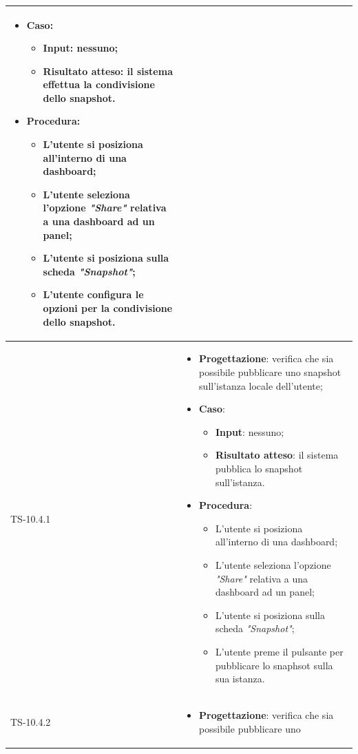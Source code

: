\begin{longtable}{|C{2.5cm}|C{13cm}|}
\begin{itemize}
	\item \textbf{Caso}: 
	\begin{itemize}
		\item \textbf{Input}: nessuno;
		\item \textbf{Risultato atteso}: il sistema effettua la condivisione dello snapshot.
	\end{itemize}
	\item \textbf{Procedura}:
	\begin{itemize}
		\item L'utente si posiziona all'interno di una dashboard;
		\item L'utente seleziona l'opzione \emph{"Share"} relativa a una dashboard ad un panel;
		\item L'utente si posiziona sulla scheda \emph{"Snapshot"};
		\item L'utente configura le opzioni per la condivisione dello snapshot.
	\end{itemize} 
\end{itemize}
	 \\
	\hline
	{TS-10.4.1} &
\begin{itemize}
	\item \textbf{Progettazione}: verifica che sia possibile pubblicare uno
	snapshot sull'istanza locale dell'utente;
	\item \textbf{Caso}: 
	\begin{itemize}
		\item \textbf{Input}: nessuno;
		\item \textbf{Risultato atteso}: il sistema pubblica lo snapshot sull'istanza.
	\end{itemize}
	\item \textbf{Procedura}:
	\begin{itemize}
		\item L'utente si posiziona all'interno di una dashboard;
		\item L'utente seleziona l'opzione \emph{"Share"} relativa a una dashboard ad un panel;
		\item L'utente si posiziona sulla scheda \emph{"Snapshot"};
		\item L'utente preme il pulsante per pubblicare lo snaphsot sulla sua istanza.
	\end{itemize} 
\end{itemize}
	  \\
	\hline
	{TS-10.4.2} & 
\begin{itemize}
	\item \textbf{Progettazione}: verifica che sia possibile pubblicare uno

\end{itemize}
\end{longtable}
